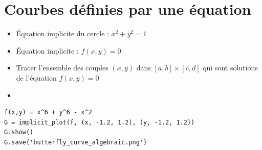 \section{Courbes définies par une équation}

\begin{frame}[fragile]

\begin{minipage}{0.65\textwidth}
\begin{itemize}
  \item \'Equation implicite du cercle : $x^2+y^2 = 1$
  \pause
  \item \'Equation implicite : $f(x,y)=0$ 
  \pause
  \item Tracer l'ensemble des couples $(x,y)$ dans $[a,b]\times[c,d]$ qui sont solutions de l'équation 
$f(x,y)=0$
\end{itemize}
\end{minipage}
\begin{minipage}{0.29\textwidth}
\begin{center}
\end{center}
\end{minipage}
\pause
\begin{itemize}
  \item {}
\end{itemize}
\pause\pause
\begin{algo}
\begin{lstlisting}
f(x,y) = x^6 + y^6 - x^2
G = implicit_plot(f, (x, -1.2, 1.2), (y, -1.2, 1.2))
G.show()
G.save('butterfly_curve_algebraic.png')
\end{lstlisting}
\end{algo}
\end{frame}


